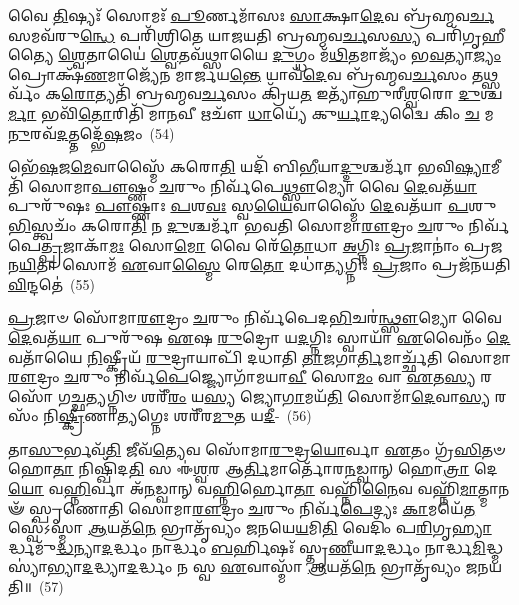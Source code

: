 𑌵𑍈 \ul{𑌤𑌿}\-𑌷𑍍𑌯𑌃᳴ 𑌸𑍋𑌮𑌃᳴ \ul{𑌪𑍂}\-𑌰𑍍𑌣𑌮𑌾᳴𑌸𑌃 \ul{𑌸𑌾}\-𑌕𑍍𑌷𑌾\-\ul{𑌦𑍇}\-𑌵 𑌬𑍍𑌰᳴𑌹𑍍𑌮𑌵\-\ul{𑌰𑍍𑌚}\-𑌸𑌮𑌵᳴\-𑌰𑍁\-\ul{𑌨𑍍𑌧𑍇} 𑌪𑌰𑌿᳴𑌶𑍍𑌰𑌿𑌤𑍇 𑌯𑌾𑌜𑌯𑌤𑌿 𑌬𑍍𑌰𑌹𑍍𑌮𑌵\-\ul{𑌰𑍍𑌚}\-𑌸\-\ul{𑌸𑍍𑌯} 𑌪𑌰𑌿᳴𑌗𑍃𑌹𑍀𑌤𑍍𑌯𑍈 \ul{𑌶𑍍𑌵𑍇}\-𑌤𑌾𑌯𑍈॑ \ul{𑌶𑍍𑌵𑍇}\-𑌤𑌵᳴𑌥𑍍𑌸𑌾𑌯𑍈 \ul{𑌦𑍁}\-𑌗𑍍𑌧𑌂 𑌮᳴\-\ul{𑌥𑌿}\-𑌤𑌮𑌾𑌜𑍍𑌯𑌂᳴ 𑌭\-\ul{𑌵}\-𑌤𑍍𑌯𑌾\-\ul{𑌜𑍍𑌯𑌂} 𑌪𑍍𑌰𑍋𑌕𑍍𑌷᳴\-\ul{𑌣}\-𑌮𑌾𑌜𑍍𑌯𑍇᳴𑌨 𑌮𑌾𑌰𑍍𑌜𑌯\-\ul{𑌨𑍍𑌤𑍇} 𑌯𑌾𑌵᳴\-\ul{𑌦𑍇}\-𑌵 𑌬𑍍𑌰᳴𑌹𑍍𑌮𑌵\-\ul{𑌰𑍍𑌚}\-𑌸𑌂 𑌤𑌥𑍍𑌸𑌰𑍍𑌵𑌂᳴ 𑌕\-\ul{𑌰𑍋}\-𑌤𑍍𑌯𑌤𑌿᳴ 𑌬𑍍𑌰𑌹𑍍𑌮𑌵\-\ul{𑌰𑍍𑌚}\-𑌸𑌂 𑌕𑍍𑌰𑌿᳴𑌯\-\ul{𑌤} 𑌇𑌤𑍍𑌯𑌾᳴𑌹𑍁𑌰𑍀\-\ul{𑌶𑍍𑌵}\-𑌰𑍋 \ul{𑌦𑍁}\-𑌶𑍍𑌚\-\ul{𑌰𑍍𑌮𑌾} 𑌭𑌵𑌿᳴\-\ul{𑌤𑍋}\-𑌰𑌿𑌤𑌿᳴ 𑌮𑌾\-\ul{𑌨}\-𑌵𑍀 𑌋𑌚𑍗᳴ \ul{𑌧𑌾}\-𑌯𑍍𑌯𑍇᳴ 𑌕𑍁\-\ul{𑌰𑍍𑌯𑌾}\-𑌦𑍍𑌯𑌦𑍍𑌵𑍈 𑌕𑌿𑌂 \ul{𑌚} 𑌮\-\ul{𑌨𑍁}\-𑌰𑌵᳴\-\ul{𑌦}\-𑌤𑍍𑌤𑌦𑍍𑌭𑍇᳴\-\ul{𑌷}\-𑌜𑌂~(54)

𑌭𑍇᳴\-\ul{𑌷}\-𑌜\-\ul{𑌮𑍇}\-𑌵𑌾𑌸𑍍𑌮𑍈᳴ 𑌕𑌰𑍋\-\ul{𑌤𑌿} 𑌯𑌦𑌿᳴ 𑌬𑌿\-\ul{𑌭𑍀}\-𑌯𑌾\-\ul{𑌦𑍍𑌦𑍁}\-𑌶𑍍𑌚𑌰𑍍𑌮𑌾᳴ 𑌭𑌵𑌿\-\ul{𑌷𑍍𑌯𑌾}\-𑌮𑍀𑌤𑌿᳴ 𑌸𑍋𑌮𑌾\-\ul{𑌪𑍗}\-𑌷𑍍𑌣𑌂 \ul{𑌚}\-𑌰𑍁𑌂 𑌨𑌿𑌰𑍍𑌵᳴𑌪𑍇\-\ul{𑌥𑍍𑌸𑍗}\-𑌮𑍍𑌯𑍋 𑌵𑍈 \ul{𑌦𑍇}\-𑌵𑌤᳴\-\ul{𑌯𑌾} 𑌪𑍁𑌰𑍁᳴𑌷𑌃 \ul{𑌪𑍗}\-𑌷𑍍𑌣𑌾𑌃 \ul{𑌪}\-𑌶\-\ul{𑌵𑌃} 𑌸𑍍𑌵\-\ul{𑌯𑍈}\-𑌵𑌾𑌸𑍍𑌮𑍈᳴ \ul{𑌦𑍇}\-𑌵𑌤᳴𑌯𑌾 \ul{𑌪}\-𑌶𑍁\-\ul{𑌭𑌿}\-𑌸𑍍𑌤𑍍𑌵𑌚𑌂᳴ 𑌕𑌰𑍋\-\ul{𑌤𑌿} 𑌨 \ul{𑌦𑍁}\-𑌶𑍍𑌚𑌰𑍍𑌮𑌾᳴ 𑌭𑌵𑌤𑌿 𑌸𑍋𑌮𑌾\-\ul{𑌰𑍗}\-𑌦𑍍𑌰𑌂 \ul{𑌚}\-𑌰𑍁𑌂 𑌨𑌿𑌰𑍍𑌵᳴𑌪𑍇\-\ul{𑌤𑍍𑌪𑍍𑌰}\-𑌜𑌾𑌕𑌾᳴\-\ul{𑌮𑌃} 𑌸𑍋\-\ul{𑌮𑍋} 𑌵𑍈 𑌰𑍇᳴\-\ul{𑌤𑍋}\-𑌧𑌾 \ul{𑌅}\-𑌗𑍍𑌨𑌿𑌃 \ul{𑌪𑍍𑌰}\-𑌜𑌾𑌨𑌾𑌂॑ 𑌪𑍍𑌰𑌜𑌨\-\ul{𑌯𑌿}\-𑌤𑌾 𑌸𑍋𑌮᳴ \ul{𑌏}\-𑌵𑌾\-\ul{𑌸𑍍𑌮𑍈} 𑌰𑍇\-\ul{𑌤𑍋} 𑌦𑌧𑌾॑\-\ul{𑌤𑍍𑌯}\-𑌗𑍍𑌨𑌿𑌃 \ul{𑌪𑍍𑌰}\-𑌜𑌾𑌂 𑌪𑍍𑌰𑌜᳴𑌨𑌯𑌤𑌿 \ul{𑌵𑌿}\-𑌨𑍍𑌦𑌤𑍇॑~(55)

\-\ul{𑌪𑍍𑌰}\-𑌜𑌾𑍞 𑌸𑍋᳴𑌮𑌾\-\ul{𑌰𑍗}\-𑌦𑍍𑌰𑌂 \ul{𑌚}\-𑌰𑍁𑌂 𑌨𑌿𑌰𑍍𑌵᳴𑌪𑍇𑌦\-\ul{𑌭𑌿}\-𑌚𑌰॑\-\ul{𑌨𑍍𑌥𑍍𑌸𑍗}\-𑌮𑍍𑌯𑍋 𑌵𑍈 \ul{𑌦𑍇}\-𑌵𑌤᳴\-\ul{𑌯𑌾} 𑌪𑍁𑌰𑍁᳴𑌷 \ul{𑌏}\-𑌷 \ul{𑌰𑍁}\-𑌦𑍍𑌰𑍋 𑌯\-\ul{𑌦}\-𑌗𑍍𑌨𑌿𑌃 𑌸𑍍𑌵𑌾𑌯𑌾᳴ \ul{𑌏}\-𑌵𑍈𑌨𑌂᳴ \ul{𑌦𑍇}\-𑌵𑌤𑌾᳴𑌯𑍈 \ul{𑌨𑌿}\-𑌷𑍍𑌕𑍍𑌰𑍀𑌯᳴ \ul{𑌰𑍁}\-𑌦𑍍𑌰𑌾𑌯𑌾𑌪𑌿᳴ 𑌦𑌧𑌾𑌤𑌿 \ul{𑌤𑌾}\-𑌜𑌗𑌾\-\ul{𑌰𑍍𑌤𑌿}\-𑌮𑌾𑌰𑍍𑌚𑍍𑌛᳴𑌤𑌿 𑌸𑍋𑌮𑌾\-\ul{𑌰𑍗}\-𑌦𑍍𑌰𑌂 \ul{𑌚}\-𑌰𑍁𑌂 𑌨𑌿𑌰𑍍𑌵᳴\-\ul{𑌪𑍇}\-𑌜𑍍𑌜𑍍𑌯𑍋𑌗𑌾᳴𑌮𑌯𑌾\-\ul{𑌵𑍀} 𑌸𑍋\-\ul{𑌮𑌂} 𑌵𑌾 \ul{𑌏}\-𑌤\-\ul{𑌸𑍍𑌯} 𑌰𑌸𑍋᳴ 𑌗𑌚𑍍𑌛\-\ul{𑌤𑍍𑌯}\-𑌗𑍍𑌨𑌿𑍞 𑌶𑌰𑍀᳴\-\ul{𑌰𑌂} 𑌯\-\ul{𑌸𑍍𑌯} 𑌜𑍍𑌯𑍋\-\ul{𑌗𑌾}\-𑌮𑌯᳴\-\ul{𑌤𑌿} 𑌸𑍋𑌮𑌾᳴\-\ul{𑌦𑍇}\-𑌵𑌾\-\ul{𑌸𑍍𑌯} 𑌰𑌸𑌂᳴ 𑌨𑌿\-\ul{𑌷𑍍𑌕𑍍𑌰𑍀}\-𑌣𑌾\-\ul{𑌤𑍍𑌯}\-𑌗𑍍𑌨𑍇𑌃 𑌶𑌰𑍀᳴𑌰\-\ul{𑌮𑍁}\-𑌤 𑌯\-\ul{𑌦𑍀}\--~(56)

𑌤𑌾\-\ul{𑌸𑍁}\-𑌰𑍍𑌭𑌵᳴\-\ul{𑌤𑌿} 𑌜𑍀𑌵᳴\-\ul{𑌤𑍍𑌯𑍇}\-𑌵 𑌸𑍋᳴𑌮𑌾\-\ul{𑌰𑍁}\-𑌦𑍍𑌰\-\ul{𑌯𑍋}\-𑌰𑍍𑌵𑌾 \ul{𑌏}\-𑌤𑌂 𑌗𑍍𑌰᳴\-\ul{𑌸𑌿}\-𑌤𑍞 𑌹𑍋\-\ul{𑌤𑌾} 𑌨𑌿𑌷𑍍𑌖𑌿᳴𑌦\-\ul{𑌤𑌿} 𑌸 𑌈॑\-\ul{𑌶𑍍𑌵}\-𑌰 𑌆\-\ul{𑌰𑍍𑌤𑌿}\-𑌮𑌾𑌰𑍍𑌤𑍋᳴𑌰\-\ul{𑌨}\-𑌡𑍍𑌵𑌾𑌨𑍍 𑌹𑍋\-\ul{𑌤𑍍𑌰𑌾} 𑌦𑍇\-\ul{𑌯𑍋} 𑌵\-\ul{𑌹𑍍𑌨𑌿}\-𑌰𑍍𑌵𑌾 𑌅᳴\-\ul{𑌨}\-𑌡𑍍𑌵𑌾𑌨𑍍 𑌵\-\ul{𑌹𑍍𑌨𑌿}\-𑌰𑍍\mbox{}𑌹𑍋\-\ul{𑌤𑌾} 𑌵𑌹𑍍𑌨𑌿᳴\-\ul{𑌨𑍈}\-𑌵 𑌵𑌹𑍍𑌨𑌿᳴\-\ul{𑌮𑌾}\-𑌤𑍍𑌮𑌾𑌨𑍟᳴ 𑌸𑍍𑌪𑍃𑌣𑍋𑌤𑌿 𑌸𑍋𑌮𑌾\-\ul{𑌰𑍗}\-𑌦𑍍𑌰𑌂 \ul{𑌚}\-𑌰𑍁𑌂 𑌨𑌿𑌰𑍍𑌵᳴\-\ul{𑌪𑍇}\-𑌦𑍍𑌯𑌃 \ul{𑌕𑌾}\-𑌮𑌯𑍇᳴\-\ul{𑌤} 𑌸𑍍𑌵𑍇॑\-𑌽𑌸𑍍𑌮𑌾 \ul{𑌆}\-𑌯𑌤᳴\-\ul{𑌨𑍇} 𑌭𑍍𑌰𑌾𑌤𑍃᳴𑌵𑍍𑌯𑌂 𑌜𑌨𑌯𑍇\-\ul{𑌯}\-𑌮𑌿\-\ul{𑌤𑌿} 𑌵𑍇𑌦𑌿𑌂᳴ 𑌪\-\ul{𑌰𑌿}\-𑌗𑍃\-\ul{𑌹𑍍𑌯𑌾}\-𑌰𑍍𑌦𑍍𑌧𑌮𑍁᳴\-\ul{𑌦𑍍𑌧}\-𑌨𑍍𑌯𑌾\-\ul{𑌦}\-𑌰𑍍𑌦𑍍𑌧𑌂 𑌨𑌾𑌰𑍍𑌦𑍍𑌧𑌂 \ul{𑌬}\-𑌰𑍍\mbox{}𑌹𑌿𑌷𑌃᳴ 𑌸𑍍𑌤𑍃\-\ul{𑌣𑍀}\-𑌯𑌾\-\ul{𑌦}\-𑌰𑍍𑌦𑍍𑌧𑌂 𑌨𑌾𑌰𑍍𑌦𑍍𑌧\-\ul{𑌮𑌿}\-𑌦𑍍𑌧𑍍𑌮𑌸𑍍𑌯𑌾॑𑌭𑍍𑌯𑌾\-\ul{𑌦}\-𑌦𑍍𑌧𑍍𑌯𑌾\-\ul{𑌦}\-𑌰𑍍𑌦𑍍𑌧𑌂 𑌨 𑌸𑍍𑌵 \ul{𑌏}\-𑌵𑌾𑌸𑍍𑌮𑌾᳴ \ul{𑌆}\-𑌯𑌤᳴\-\ul{𑌨𑍇} 𑌭𑍍𑌰𑌾𑌤𑍃᳴𑌵𑍍𑌯𑌂 𑌜𑌨𑌯𑌤𑌿॥~(57)

